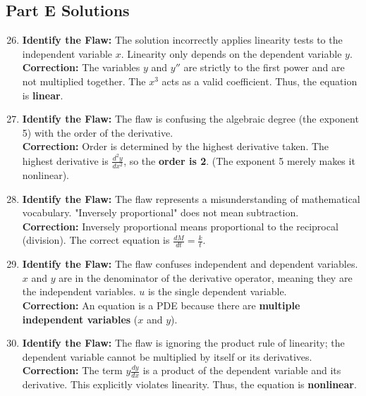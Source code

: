 \documentclass{article}
\begin{document}
\subsection*{Part E Solutions}
\begin{enumerate}
    \setcounter{enumi}{25}
    \item \textbf{Identify the Flaw:} The solution incorrectly applies linearity tests to the independent variable $x$. Linearity only depends on the dependent variable $y$. \\
    \textbf{Correction:} The variables $y$ and $y''$ are strictly to the first power and are not multiplied together. The $x^3$ acts as a valid coefficient. Thus, the equation is \textbf{linear}.
    
    \item \textbf{Identify the Flaw:} The flaw is confusing the algebraic degree (the exponent 5) with the order of the derivative. \\
    \textbf{Correction:} Order is determined by the highest derivative taken. The highest derivative is $\frac{d^2 y}{dx^2}$, so the \textbf{order is 2}. (The exponent 5 merely makes it nonlinear).
    
    \item \textbf{Identify the Flaw:} The flaw represents a misunderstanding of mathematical vocabulary. "Inversely proportional" does not mean subtraction. \\
    \textbf{Correction:} Inversely proportional means proportional to the reciprocal (division). The correct equation is $\frac{dM}{dt} = \frac{k}{t}$.
    
    \item \textbf{Identify the Flaw:} The flaw confuses independent and dependent variables. $x$ and $y$ are in the denominator of the derivative operator, meaning they are the independent variables. $u$ is the single dependent variable. \\
    \textbf{Correction:} An equation is a PDE because there are \textbf{multiple independent variables} ($x$ and $y$). 
    
    \item \textbf{Identify the Flaw:} The flaw is ignoring the product rule of linearity; the dependent variable cannot be multiplied by itself or its derivatives. \\
    \textbf{Correction:} The term $y \frac{dy}{dx}$ is a product of the dependent variable and its derivative. This explicitly violates linearity. Thus, the equation is \textbf{nonlinear}.
\end{enumerate}
\end{document}
